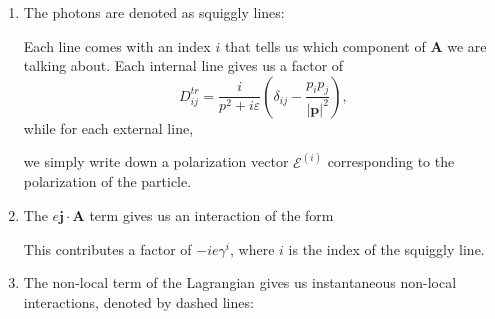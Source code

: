\documentclass[a4paper]{article}
\begin{document}
\begin{enumerate}
  \item The photons are denoted as squiggly lines:
    \begin{center}
    \end{center}
    Each line comes with an index $i$ that tells us which component of $\mathbf{A}$ we are talking about. Each internal line gives us a factor of
    \[
      D_{ij}^{tr} = \frac{i}{p^2 + i \varepsilon} \left(\delta_{ij} - \frac{p_i p_j}{|\mathbf{p}|^2}\right),
    \]
    while for each external line,
     \begin{center}
    \end{center}
    we simply write down a polarization vector $\mathcal{E}^{(i)}$ corresponding to the polarization of the particle.

  \item The $e \mathbf{j}\cdot \mathbf{A}$ term gives us an interaction of the form
    \begin{center}
    \end{center}
    This contributes a factor of $-ie\gamma^i$, where $i$ is the index of the squiggly line.

  \item The non-local term of the Lagrangian gives us instantaneous non-local interactions, denoted by dashed lines:
    \begin{center}
\end{center}
\end{enumerate}
\end{document}
